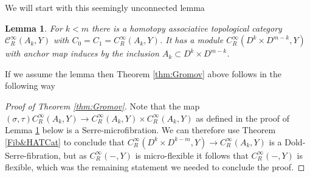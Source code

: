 \documentclass{article}
\newtheorem{lemma}[theorem]{Lemma}
\newtheorem{proposed work}[theorem]{Proposed Work}
\theoremstyle{definition}
\begin{document}
We will start with this seemingly unconnected lemma
\begin{lemma}\label{lem:AnnCat}
For $k<m$ there is a homotopy associative topological category $\mathcal{C}^\infty_R(A_k,Y)$ with $C_0=C_1=C^\infty_R(A_k,Y)$. It has a module $C^\infty_R(D^k\times D^{m-k},Y)$ with anchor map induces by the inclusion $A_k\subset D^k \times D^{m-k}$.
\end{lemma}
If we assume the lemma then Theorem \ref{thm:Gromov} above follows in the following way
\begin{proof}[Proof of Theorem \ref{thm:Gromov}]
Note that the map $(\sigma,\tau) C^\infty_R(A_k,Y)\to C^\infty_R(A_k,Y)\times C^\infty_R(A_k,Y)$ as defined in the proof of Lemma \ref{lem:AnnCat} below is a Serre-microfibration. We can therefore use Theorem \ref{Fib&HATCat} to conclude that $C^\infty_R(D^k\times D^{k-m},Y)\to C^\infty_R(A_k,Y)$ is a Dold-Serre-fibration, but as $C^\infty_R(-,Y)$ is micro-flexible it follows that $C^\infty_R(-,Y)$ is flexible, which was the remaining statement we needed to conclude the proof.
\end{proof}
\end{document}
